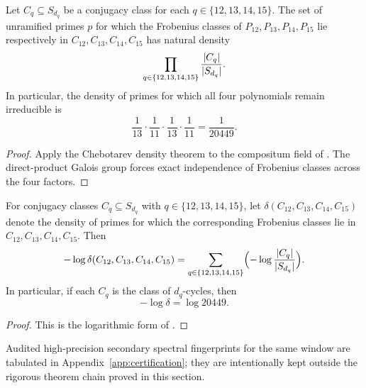 \begin{corollary}
\label{cor:chebotarev-product}
Let \(C_q\subseteq S_{d_q}\) be a conjugacy class for each
\(q\in\{12,13,14,15\}\).  The set of unramified primes \(p\) for which the
Frobenius classes of \(P_{12},P_{13},P_{14},P_{15}\) lie respectively in
\(C_{12},C_{13},C_{14},C_{15}\) has natural density
\[
  \prod_{q\in\{12,13,14,15\}}\frac{\lvert C_q \rvert}{\lvert S_{d_q} \rvert}.
\]
In particular, the density of primes for which all four polynomials remain
irreducible is
\[
  \frac{1}{13}\cdot\frac{1}{11}\cdot\frac{1}{13}\cdot\frac{1}{11}
  =\frac{1}{20449}.
\]
\end{corollary}

\begin{proof}
Apply the Chebotarev density theorem \cite{Neukirch1999} to the compositum
field of .  The direct-product Galois group
forces exact independence of Frobenius classes across the four factors.
\end{proof}

\begin{corollary}
\label{cor:log-density-additivity}
For conjugacy classes \(C_q\subseteq S_{d_q}\) with \(q\in\{12,13,14,15\}\),
let \(\delta(C_{12},C_{13},C_{14},C_{15})\) denote the density of primes for
which the corresponding Frobenius classes lie in
\(C_{12},C_{13},C_{14},C_{15}\).  Then
\[
  -\log \delta(C_{12},C_{13},C_{14},C_{15})
  =
  \sum_{q\in\{12,13,14,15\}}
  \Bigl(-\log \frac{\lvert C_q \rvert}{\lvert S_{d_q} \rvert}\Bigr).
\]
In particular, if each \(C_q\) is the class of \(d_q\)-cycles, then
\[
  -\log \delta = \log 20449.
\]
\end{corollary}

\begin{proof}
This is the logarithmic form of .
\end{proof}

Audited high-precision secondary spectral fingerprints for the same window are
tabulated in Appendix~\ref{app:certification}; they are intentionally kept
outside the rigorous theorem chain proved in this section.
